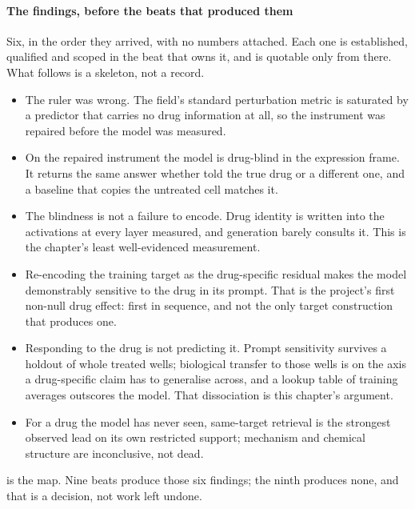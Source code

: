\paragraph{The findings, before the beats that produced them} Six, in the order
they arrived, with no numbers attached. Each one is established, qualified and
scoped in the beat that owns it, and is quotable only from there. What follows
is a skeleton, not a record.

\begin{itemize}
\item The ruler was wrong. The field's standard perturbation metric is saturated
  by a predictor that carries no drug information at all, so the instrument was
  repaired before the model was measured.
\item On the repaired instrument the model is drug-blind in the expression
  frame. It returns the same answer whether told the true drug or a different
  one, and a baseline that copies the untreated cell matches it.
\item The blindness is not a failure to encode. Drug identity is written into
  the activations at every layer measured, and generation barely consults it.
  This is the chapter's least well-evidenced measurement.
\item Re-encoding the training target as the drug-specific residual makes the
  model demonstrably sensitive to the drug in its prompt. That is the project's
  first non-null drug effect: first in sequence, and not the only target
  construction that produces one.
\item Responding to the drug is not predicting it. Prompt sensitivity survives a
  holdout of whole treated wells; biological transfer to those wells is
  \notestablished on the axis a drug-specific claim has to generalise across, and
  a lookup table of training averages outscores the model. That dissociation is
  this chapter's argument.
\item For a drug the model has never seen, same-target retrieval is the
  strongest observed lead on its own restricted support; mechanism and chemical
  structure are inconclusive, not dead.
\end{itemize}

\noindent
{} is the map. Nine beats produce those six findings; the ninth
produces none, and that is a decision, not work left undone.

